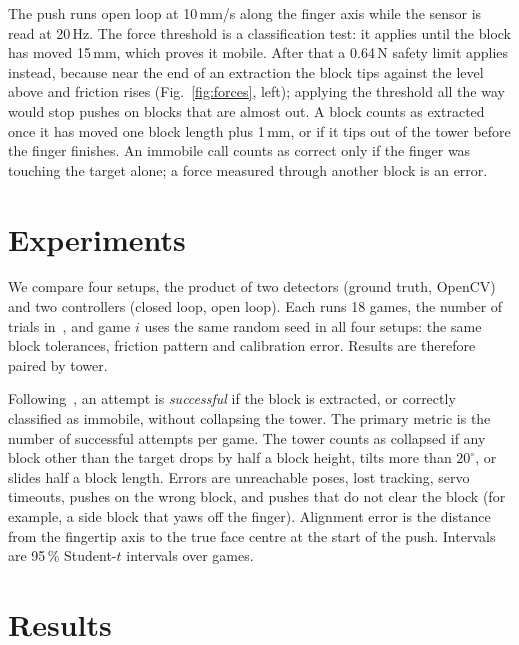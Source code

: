 \documentclass[conference]{IEEEtran}
\begin{document}
The push runs open loop at 10\,mm/s along the finger axis while the sensor is read at
20\,Hz. The force threshold is a classification test: it applies until the block has
moved 15\,mm, which proves it mobile. After that a 0.64\,N safety limit applies
instead, because near the end of an extraction the block tips against the level above
and friction rises (Fig.~\ref{fig:forces}, left); applying the threshold all the way
would stop pushes on blocks that are almost out. A block counts as extracted once it
has moved one block length plus 1\,mm, or if it tips out of the tower before the
finger finishes. An immobile call counts as correct only if the finger was touching
the target alone; a force measured through another block is an error.

\section{Experiments}

We compare four setups, the product of two detectors (ground truth, OpenCV) and two
controllers (closed loop, open loop). Each runs 18 games, the number of trials
in~\cite{marchionna2023}, and game $i$ uses the same random seed in all four setups:
the same block tolerances, friction pattern and calibration error. Results are
therefore paired by tower.

Following~\cite{marchionna2023}, an attempt is \emph{successful} if the block is
extracted, or correctly classified as immobile, without collapsing the tower. The
primary metric is the number of successful attempts per game. The tower counts as
collapsed if any block other than the target drops by half a block height, tilts more
than $20^\circ$, or slides half a block length. Errors are unreachable poses, lost
tracking, servo timeouts, pushes on the wrong block, and pushes that do not clear the
block (for example, a side block that yaws off the finger). Alignment error is the
distance from the fingertip axis to the true face centre at the start of the push.
Intervals are 95\,\% Student-$t$ intervals over games.

\section{Results}
\end{document}
